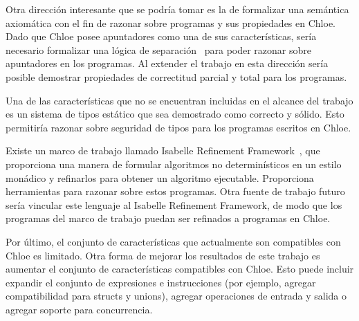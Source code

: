 Otra dirección interesante que se podría tomar es la de formalizar una semántica axiomática con el fin de razonar sobre programas y sus propiedades en Chloe.
Dado que Chloe posee apuntadores como una de sus características, sería necesario formalizar una lógica de separación~\cite{sep-logic} para poder razonar sobre apuntadores en los programas.
Al extender el trabajo en esta dirección sería posible demostrar propiedades de correctitud parcial y total para los programas.

Una de las características que no se encuentran incluidas en el alcance del trabajo es un sistema de tipos estático que sea demostrado como correcto y sólido.
Esto permitiría razonar sobre seguridad de tipos para los programas escritos en Chloe.

Existe un marco de trabajo llamado Isabelle Refinement Framework~\cite{Refine_Monadic-AFP}, que proporciona una manera de formular algoritmos no determinísticos en un estilo monádico y refinarlos para obtener un algoritmo ejecutable.
Proporciona herramientas para razonar sobre estos programas.
Otra fuente de trabajo futuro sería vincular este lenguaje al Isabelle Refinement Framework, de modo que los programas del marco de trabajo puedan ser refinados a programas en Chloe.

Por último, el conjunto de características que actualmente son compatibles con Chloe es limitado.
Otra forma de mejorar los resultados de este trabajo es aumentar el conjunto de características compatibles con Chloe.
Esto puede incluir expandir el conjunto de expresiones e instrucciones (por ejemplo, agregar compatibilidad para structs y unions), agregar operaciones de entrada y salida o agregar soporte para concurrencia.
